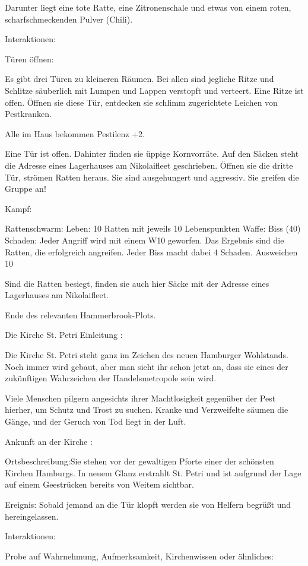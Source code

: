 Darunter liegt eine tote Ratte, eine Zitronenschale und etwas von einem roten, scharfschmeckenden Pulver (Chili).

Interaktionen:

Türen öffnen:

Es gibt drei Türen zu kleineren Räumen. Bei allen sind jegliche Ritze und Schlitze säuberlich mit Lumpen und Lappen verstopft und verteert. Eine Ritze ist offen.
Öffnen sie diese Tür, entdecken sie schlimm zugerichtete Leichen von Pestkranken.

Alle im Haus bekommen Pestilenz +2.

Eine Tür ist offen. Dahinter finden sie üppige Kornvorräte. Auf den Säcken steht die Adresse eines Lagerhauses am Nikolaifleet geschrieben.
Öffnen sie die dritte Tür, strömen Ratten heraus. Sie sind ausgehungert und aggressiv. Sie greifen die Gruppe an!

Kampf:

Rattenschwarm:
Leben: 10 Ratten mit jeweils 10 Lebenspunkten
Waffe: Biss (40)
Schaden: Jeder Angriff wird mit einem W10 geworfen. Das Ergebnis sind die Ratten, die erfolgreich angreifen. Jeder Biss macht dabei 4 Schaden.
Ausweichen 10

Sind die Ratten besiegt, finden sie auch hier Säcke mit der Adresse eines Lagerhauses am Nikolaifleet.

Ende des relevanten Hammerbrook-Plots.

Die Kirche St. Petri
Einleitung
:

Die Kirche St. Petri steht ganz im Zeichen des neuen Hamburger Wohlstands. Noch immer wird gebaut, aber man sieht ihr schon jetzt an, dass sie eines der zukünftigen Wahrzeichen der Handelsmetropole sein wird.

Viele Menschen pilgern angesichts ihrer Machtlosigkeit gegenüber der Pest hierher, um Schutz und Trost zu suchen. Kranke und Verzweifelte säumen die Gänge, und der Geruch von Tod liegt in der Luft.


Ankunft an der Kirche
:

Ortsbeschreibung:Sie stehen vor der gewaltigen Pforte einer der schönsten Kirchen Hamburgs. In neuem Glanz erstrahlt St. Petri und ist aufgrund der Lage auf einem Geestrücken bereits von Weitem sichtbar.

Ereignis: Sobald jemand an die Tür klopft werden sie von Helfern begrüßt und hereingelassen.

Interaktionen:

Probe auf Wahrnehmung, Aufmerksamkeit, Kirchenwissen oder ähnliches:

